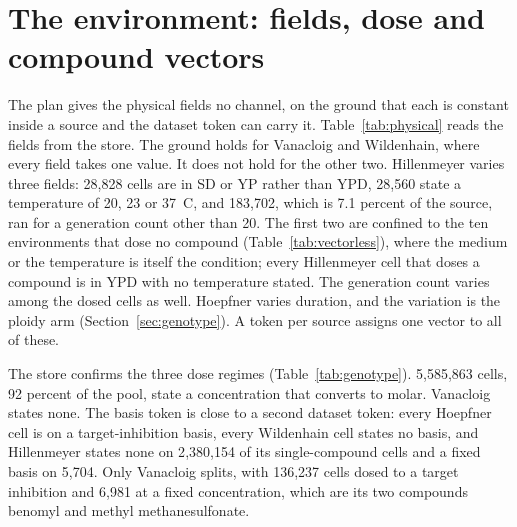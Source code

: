 
\section{The environment: fields, dose and compound vectors}
\label{sec:environment}

The plan gives the physical fields no channel, on the ground that each is constant inside
a source and the dataset token can carry it. Table~\ref{tab:physical} reads the fields
from the store. The ground holds for Vanacloig and Wildenhain, where every field takes one
value. It does not hold for the other two. Hillenmeyer varies three fields: 28{,}828 cells
are in SD or YP rather than YPD, 28{,}560 state a temperature of 20, 23 or 37~C, and
183{,}702, which is 7.1 percent of the source, ran for a generation count other than 20.
The first two are confined to the ten environments that dose no compound
(Table~\ref{tab:vectorless}), where the medium or the temperature is itself the
condition; every Hillenmeyer cell that doses a compound is in YPD with no temperature
stated. The generation count varies among the dosed cells as well. Hoepfner varies
duration, and the variation is the ploidy arm (Section~\ref{sec:genotype}). A token per
source assigns one vector to all of these.

\begin{table}[htbp]
\centering
\footnotesize
\caption{Physical and medium fields of the store's cells, the distinct values per source
ordered by cell count. The cell counts behind each value are in
\texttt{results/store\_axes.csv}.}
\label{tab:physical}

\end{table}

The store confirms the three dose regimes (Table~\ref{tab:genotype}). 5{,}585{,}863 cells,
92 percent of the pool, state a concentration that converts to molar. Vanacloig states
none. The basis token is close to a second dataset token: every Hoepfner cell is on a
target-inhibition basis, every Wildenhain cell states no basis, and Hillenmeyer states
none on 2{,}380{,}154 of its single-compound cells and a fixed basis on 5{,}704. Only
Vanacloig splits, with 136{,}237 cells dosed to a target inhibition and 6{,}981 at a fixed
concentration, which are its two compounds benomyl and methyl methanesulfonate.

